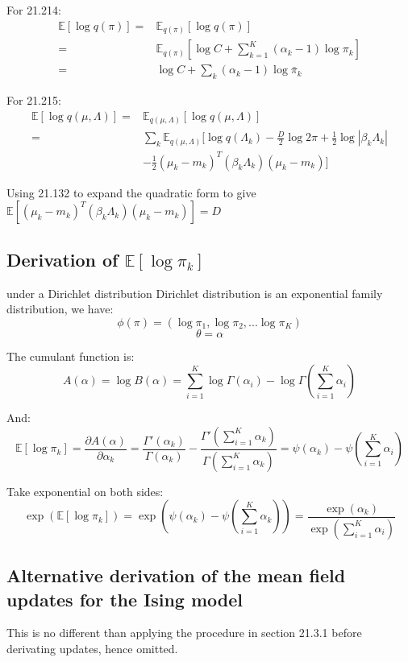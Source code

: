 \documentclass[UTF8]{ctexart}
\begin{document}
For 21.214:
\begin{align}
\mathbb{E}[\log q(\pi)]=&\mathbb{E}_{q(\pi)}[\log q(\pi)] \nonumber \\
=&\mathbb{E}_{q(\pi)}[\log C + \sum_{k=1}^{K}(\alpha_{k}-1)\log \pi_{k}] \nonumber \\
=&\log C + \sum_{k}(\alpha_{k}-1)\log \bar{\pi}_{k} \nonumber
\end{align}

For 21.215:
\begin{align}
\mathbb{E}[\log q(\mu,\Lambda)]=& \mathbb{E}_{q(\mu,\Lambda)}[\log q(\mu,\Lambda)] \nonumber \\
=&\sum_{k}\mathbb{E}_{q(\mu,\Lambda)}[\log q(\Lambda_{k})-\frac{D}{2}\log 2\pi +\frac{1}{2}\log |\beta_{k}\Lambda_{k}|\nonumber \\
\ &-\frac{1}{2}(\mu_{k}-m_{k})^{T}(\beta_{k}\Lambda_{k})(\mu_{k}-m_{k})  ]\nonumber
\end{align}

Using 21.132 to expand the quadratic form to give $\mathbb{E}[(\mu_{k}-m_{k})^{T}(\beta_{k}\Lambda_{k})(\mu_{k}-m_{k})]=D$

\subsection{Derivation of $\mathbb{E}[\log \pi_{k}]$} under a Dirichlet distribution
Dirichlet distribution is an exponential family distribution, we have:
$$\phi(\pi)=(\log \pi_{1},\log \pi_{2},...\log \pi_{K})$$
$$\theta=\alpha$$

The cumulant function is:
$$A(\alpha)=\log B(\alpha) = \sum_{i=1}^{K}\log \Gamma(\alpha_{i})-\log \Gamma(\sum_{i=1}^{K}\alpha_{i})$$

And:
$$\mathbb{E}[\log \pi_{k}]=\frac{\partial A(\alpha)}{\partial \alpha_{k}} = \frac{\Gamma'(\alpha_{k})}{\Gamma(\alpha_{k})}- \frac{\Gamma'(\sum_{i=1}^{K}\alpha_{k})}{\Gamma(\sum_{i=1}^{K}\alpha_{k})}=\psi(\alpha_{k})-\psi(\sum_{i=1}^{K}\alpha_{i})$$

Take exponential on both sides:
$$\exp(\mathbb{E}[\log \pi_{k}])=\exp(\psi(\alpha_{k})-\psi(\sum_{i=1}^{K}\alpha_{k}))=\frac{\exp(\alpha_{k})}{\exp(\sum_{i=1}^{K}\alpha_{i})}$$

\subsection{Alternative derivation of the mean field updates for the Ising model}
This is no different than applying the procedure in section 21.3.1 before derivating updates, hence omitted.
\end{document}
